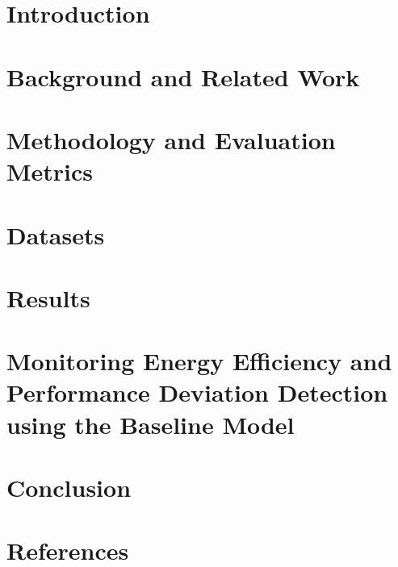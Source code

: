 \documentclass[12pt, letterpaper]{article}
\begin{document}



\pagebreak

\tableofcontents
\pagebreak
\listoffigures
\listoftables
\pagebreak

\printglossary[type=\acronymtype]

\pagebreak

\section{Introduction}

\pagebreak

\section{Background and Related Work}

\pagebreak

\section{Methodology and Evaluation Metrics}

\pagebreak

\section{Datasets}

\pagebreak

\section{Results}

\pagebreak

\section{Monitoring Energy Efficiency and Performance Deviation Detection using the Baseline Model}

\pagebreak

\section{Conclusion}

\pagebreak

\section{References}
\printbibliography[heading=none]
\pagebreak



%
\end{document}
